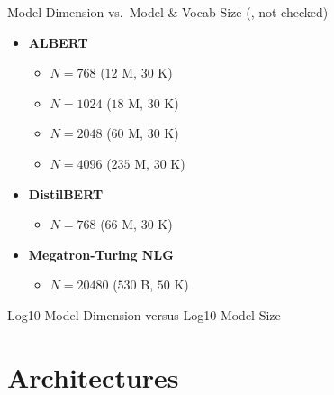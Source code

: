 \begin{slide}[\slideopts,toc={Model Dimension}]{Model Dimension vs.~Model \& Vocab Size
(, not checked)}
\begin{multicols}{2}
\begin{itemize}

    \item \textbf{ALBERT}
    \begin{itemize}
        \item $N = 768$ ($12$ M, $30$ K)
        \item $N = 1024$ ($18$ M, $30$ K)
        \item $N = 2048$ ($60$ M, $30$ K)
        \item $N = 4096$ ($235$ M, $30$ K)
    \end{itemize}

    \item \textbf{DistilBERT}
    \begin{itemize}
        \item $N = 768$ ($66$ M, $30$ K)
    \end{itemize}

    \item \textbf{Megatron-Turing NLG}
    \begin{itemize}
        \item $N = 20480$ ($530$ B, $50$ K)
    \end{itemize}

\end{itemize}
\end{multicols}

\end{slide}

\begin{slidewhite}[\slideopts,toc={}]{Log10 Model Dimension versus Log10 Model Size}

\vspace{-2em}


\end{slidewhite}


\section[\sectopts,toc={Architectures}]{Architectures}

